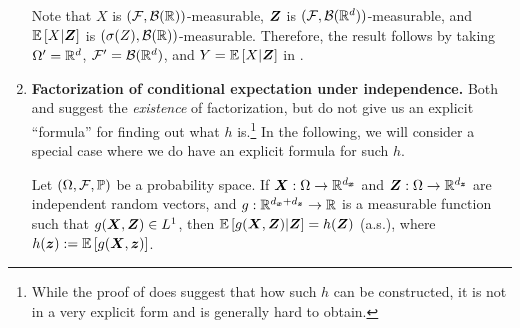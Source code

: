 \begin{enumerate}
\begin{pf}
Note that \(X\) is \((\mathcal{F},\mathcal{B}(\mathbb{R}))\)-measurable, \(\bm{Z}\)
is \((\mathcal{F},\mathcal{B}(\mathbb{R}^{d}))\)-measurable, and \(\mathbb{E}\left[X|\bm{Z}\right]\)
is \((\sigma(Z),\mathcal{B}(\mathbb{R}))\)-measurable. Therefore, the result follows by
taking \(\Omega'=\mathbb{R}^{d}\), \(\mathcal{F}'=\mathcal{B}(\mathbb{R}^{d})\), and
\(Y=\mathbb{E}\left[X|\bm{Z}\right]\) in .
\end{pf}
\item \textbf{Factorization of conditional expectation under independence.}
Both  and  suggest the
\emph{existence} of factorization, but do not give us an explicit ``formula''
for finding out what \(h\) is.\footnote{While the proof of
 does suggest that how such \(h\) can be constructed,
it is not in a very explicit form and is generally hard to obtain.} In the
following, we will consider a special case where we do have an explicit formula
for such \(h\).

\begin{proposition}
\label{prp:fact-indp}
Let \((\Omega,\mathcal{F},\mathbb{P})\) be a probability space.  If
\(\bm{X}:\Omega\to\mathbb{R}^{d_{\bm{x}}}\) and
\(\bm{Z}:\Omega\to\mathbb{R}^{d_{\bm{z}}}\) are independent random vectors, and
\(g:\mathbb{R}^{d_{\bm{x}}+d_{\bm{z}}}\to\mathbb{R}\) is a measurable function such that
\(g(\bm{X},\bm{Z})\in L^{1}\), then
\(\mathbb{E}\left[g(\bm{X},\bm{Z})|\bm{Z}\right]=h(\bm{Z})\) (a.s.), where
\(h(\bm{z}):=\mathbb{E}\left[g(\bm{X},\bm{z})\right]\).
\end{proposition}


\end{enumerate}
